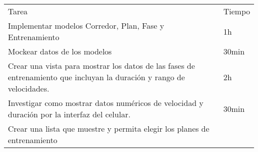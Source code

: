 \begin{enumerate}
  \begin{longtable}[c]{@{}ll@{}}
  \hline\noalign{\medskip}
  \begin{minipage}[b]{0.92\columnwidth}\raggedright
  Tarea
  \end{minipage} & \begin{minipage}[b]{0.08\columnwidth}\raggedright
  Tiempo
  \end{minipage}
  \\\noalign{\medskip}
  \hline\noalign{\medskip}
  \begin{minipage}[t]{0.92\columnwidth}\raggedright
  Implementar modelos Corredor, Plan, Fase y Entrenamiento
  \end{minipage} & \begin{minipage}[t]{0.08\columnwidth}\raggedright
  1h
  \end{minipage}
  \\\noalign{\medskip}
  \begin{minipage}[t]{0.92\columnwidth}\raggedright
  Mockear datos de los modelos
  \end{minipage} & \begin{minipage}[t]{0.08\columnwidth}\raggedright
  30min
  \end{minipage}
  \\\noalign{\medskip}
  \begin{minipage}[t]{0.92\columnwidth}\raggedright
  Crear una vista para mostrar los datos de las fases de entrenamiento
  que incluyan la duración y rango de velocidades.
  \end{minipage} & \begin{minipage}[t]{0.08\columnwidth}\raggedright
  2h
  \end{minipage}
  \\\noalign{\medskip}
  \begin{minipage}[t]{0.92\columnwidth}\raggedright
  Investigar como mostrar datos numéricos de velocidad y duración por la
  interfaz del celular.
  \end{minipage} & \begin{minipage}[t]{0.08\columnwidth}\raggedright
  30min
  \end{minipage}
  \\\noalign{\medskip}
  \begin{minipage}[t]{0.92\columnwidth}\raggedright
  Crear una lista que muestre y permita elegir los planes de
  entrenamiento
  \end{minipage} & \begin{minipage}[t]{0.08\columnwidth}\raggedright

\end{minipage}
\end{longtable}
\end{enumerate}
